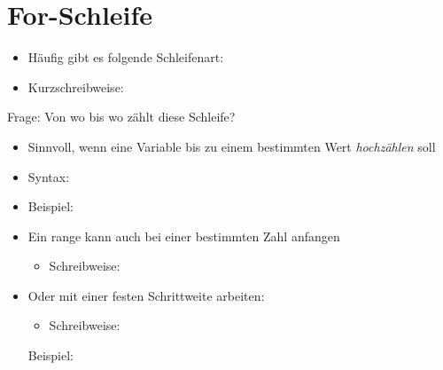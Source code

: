 \section{For-Schleife}
\begin{frame}
    \slidehead

    \begin{itemize}
        \vspace{-0.1cm}
        \item Häufig gibt es folgende Schleifenart:
            \pause
        \item Kurzschreibweise:
    \end{itemize}
    \begin{block}{Frage:}
        Von wo bis wo zählt diese Schleife?
    \end{block}
\end{frame}

\begin{frame}
    \slidehead

    \begin{itemize}
        \item Sinnvoll, wenn eine Variable bis zu einem bestimmten Wert \textit{hochzählen} soll
        \item Syntax:
        \item Beispiel:
    \end{itemize}
\end{frame}

\begin{frame}
    \slidehead

    \begin{itemize}
        \item Ein range kann auch bei einer bestimmten Zahl anfangen
            \begin{itemize}
                \item Schreibweise: 
            \end{itemize}
        \item Oder mit einer festen Schrittweite arbeiten:
            \begin{itemize}
                \item Schreibweise: 
            \end{itemize}
            Beispiel:
    \end{itemize}
\end{frame}

